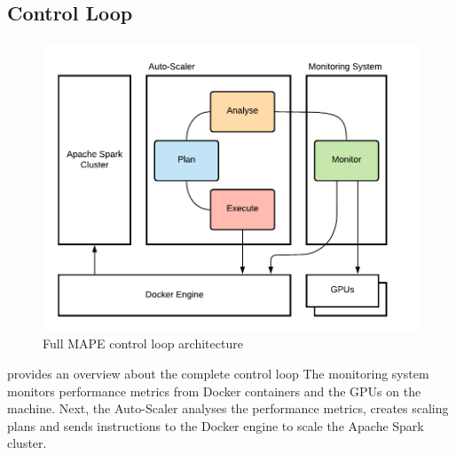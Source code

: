 \subsection{Control Loop}
\paragraph{}
\begin{figure}[h]
\centering
\includegraphics[scale=1]{images/05_conceptual_design/autonomic_manager/control_loop}
\caption{Full MAPE control loop architecture}
\label{fig:05_am_monitoring_loop_arch}
\end{figure}
 provides an overview about the complete control loop
The monitoring system monitors performance metrics from Docker containers and the GPUs on the machine.
Next, the Auto-Scaler analyses the performance metrics, creates scaling plans and sends instructions to the Docker engine to scale the Apache Spark cluster.


